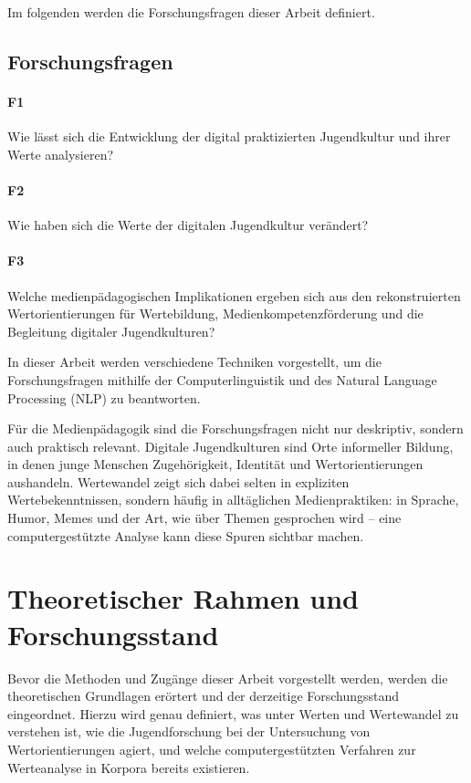 Im folgenden werden die Forschungsfragen dieser Arbeit definiert.

\subsection{Forschungsfragen}
\paragraph{F1} Wie lässt sich die Entwicklung der digital praktizierten Jugendkultur und ihrer Werte analysieren?
\paragraph{F2} Wie haben sich die Werte der digitalen Jugendkultur verändert?
\paragraph{F3} Welche medienpädagogischen Implikationen ergeben sich aus den rekonstruierten Wertorientierungen für Wertebildung, Medienkompetenzförderung und die Begleitung digitaler Jugendkulturen?

\vspace{0.5cm}
\noindent
In dieser Arbeit werden verschiedene Techniken vorgestellt, um die Forschungsfragen mithilfe der Computerlinguistik und des Natural Language Processing (NLP) zu beantworten.

Für die Medienpädagogik sind die Forschungsfragen nicht nur deskriptiv, sondern auch praktisch relevant.
Digitale Jugendkulturen sind Orte informeller Bildung, in denen junge Menschen Zugehörigkeit, Identität und Wertorientierungen aushandeln.
Wertewandel zeigt sich dabei selten in expliziten Wertebekenntnissen, sondern häufig in alltäglichen Medienpraktiken: in Sprache, Humor, Memes und der Art, wie über Themen gesprochen wird -- eine computergestützte Analyse kann diese Spuren sichtbar machen.

\section{Theoretischer Rahmen und Forschungsstand}
Bevor die Methoden und Zugänge dieser Arbeit vorgestellt werden, werden die theoretischen Grundlagen erörtert und der derzeitige Forschungsstand eingeordnet.
Hierzu wird genau definiert, was unter Werten und Wertewandel zu verstehen ist, wie die Jugendforschung bei der Untersuchung von Wertorientierungen agiert, und welche computergestützten Verfahren zur Werteanalyse in Korpora bereits existieren.

